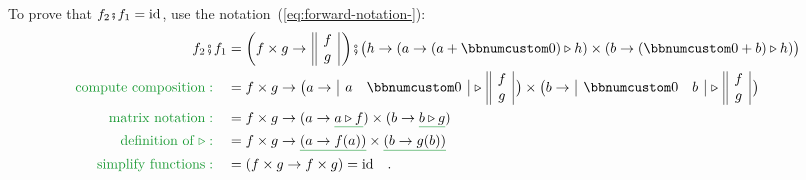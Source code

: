 To prove that $f_{2}\bef f_{1}=\text{id}$, use the notation~(\ref{eq:forward-notation-}):
\begin{align*}
f_{2}\bef f_{1} & =\bigg(f\times g\rightarrow\,\begin{array}{||c|}
f\\
g
\end{array}\,\bigg)\bef\big(h\rightarrow(a\rightarrow(a+\bbnum 0)\triangleright h)\times(b\rightarrow(\bbnum 0+b)\triangleright h)\big)\\
{\color{greenunder}\text{compute composition}:}\quad & =f\times g\rightarrow\big(a\rightarrow\,\begin{array}{|cc|}
a & \bbnum 0\end{array}\,\triangleright\,\begin{array}{||c|}
f\\
g
\end{array}\,\big)\times\big(b\rightarrow\,\begin{array}{|cc|}
\bbnum 0 & b\end{array}\,\triangleright\,\begin{array}{||c|}
f\\
g
\end{array}\,\big)\\
{\color{greenunder}\text{matrix notation}:}\quad & =f\times g\rightarrow(a\rightarrow\gunderline{a\triangleright f})\times(b\rightarrow\gunderline{b\triangleright g})\\
{\color{greenunder}\text{definition of }\triangleright:}\quad & =f\times g\rightarrow\gunderline{\left(a\rightarrow f(a)\right)}\times\gunderline{\left(b\rightarrow g(b)\right)}\\
{\color{greenunder}\text{simplify functions}:}\quad & =\left(f\times g\rightarrow f\times g\right)=\text{id}\quad.
\end{align*}

